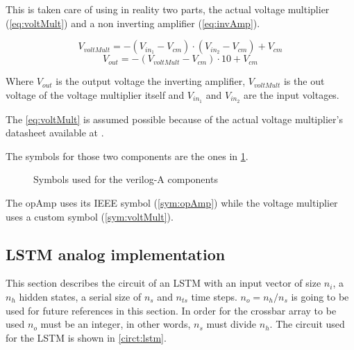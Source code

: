 This is taken care of using in reality two parts, the actual voltage multiplier (\cref{eq:voltMult}) and a non inverting amplifier (\cref{eq:invAmp}).

\begin{equation}\label{eq:voltMult}
  V_{voltMult}=-(V_{in_1}-V_{cm})\cdot (V_{in_2}-V_{cm}) + V_{cm}
\end{equation}
\begin{equation}\label{eq:invAmp}
  V_{out}=-(V_{voltMult}-V_{cm})\cdot10+V_{cm}
\end{equation}

Where $V_{out}$ is the output voltage the inverting amplifier, $V_{voltMult}$ is the out voltage of the voltage multiplier itself and $V_{in_1}$ and $V_{in_2}$ are the input voltages.

The \cref{eq:voltMult} is assumed possible because of the actual voltage multiplier's datasheet available at \cite{actualVoltMult}.

The symbols for those two components are the ones in \cref{sym:models}.

\begin{figure}[t]
  \centering
  \hspace*{1.5cm}
  \hfill
  \hspace*{1.5cm}
  \caption{Symbols used for the verilog-A components}
  \label{sym:models}
\end{figure}

The \ac{opAmp} uses its IEEE symbol (\cref{sym:opAmp}) while the voltage multiplier uses a custom symbol (\cref{sym:voltMult}).

\subsection{LSTM analog implementation}

This section describes the circuit of an \ac{LSTM} with an input vector of size $n_i$, a $n_h$ hidden states, a serial size of $n_s$ and $n_{ts}$ time steps. $n_o=n_h/n_s$ is going to be used for future references in this section. In order for the crossbar array to be used $n_o$ must be an integer, in other words, $n_s$ must divide $n_h$. The circuit used for the LSTM is shown in \cref{circt:lstm}.

\begin{figure*}[t]
  \centering
  
  \caption{\ac{LSTM} circuit}
  \label{circt:lstm}
\end{figure*}

